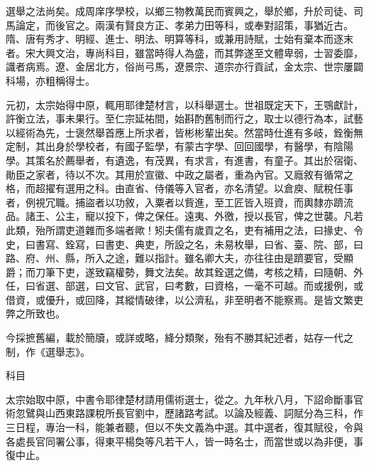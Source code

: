 
\begin{pinyinscope}

 選舉之法尚矣。成周庠序學校，以鄉三物教萬民而賓興之，舉於鄉，升於司徒、司馬論定，而後官之。兩漢有賢良方正、孝弟力田等科，或奉對詔策，事猶近古。隋、唐有秀才、明經、進士、明法、明算等科，或兼用詩賦，士始有棄本而逐末者。宋大興文治，專尚科目，雖當時得人為盛，而其弊遂至文體卑弱，士習委靡，識者病焉。遼、金居北方，俗尚弓馬，遼景宗、道宗亦行貢試，金太宗、世宗屢闢科場，亦粗稱得士。



 元初，太宗始得中原，輒用耶律楚材言，以科舉選士。世祖既定天下，王鶚獻計，許衡立法，事未果行。至仁宗延祐間，始斟酌舊制而行之，取士以德行為本，試藝以經術為先，士褒然舉首應上所求者，皆彬彬輩出矣。然當時仕進有多岐，銓衡無定制，其出身於學校者，有國子監學，有蒙古字學、回回國學，有醫學，有陰陽學。其策名於薦舉者，有遺逸，有茂異，有求言，有進書，有童子。其出於宿衛、勛臣之家者，待以不次。其用於宣徽、中政之屬者，重為內官。又廕敘有循常之格，而超擢有選用之科。由直省、侍儀等入官者，亦名清望。以倉庾、賦稅任事者，例視冗職。捕盜者以功敘，入粟者以貲進，至工匠皆入班資，而輿隸亦躋流品。諸王、公主，寵以投下，俾之保任。遠夷、外徼，授以長官，俾之世襲。凡若此類，殆所謂吏道雜而多端者歟！矧夫儒有歲貢之名，吏有補用之法，曰掾史、令史，曰書寫、銓寫，曰書吏、典吏，所設之名，未易枚舉，曰省、臺、院、部，曰路、府、州、縣，所入之途，難以指計。雖名卿大夫，亦往往由是躋要官，受顯爵；而刀筆下吏，遂致竊權勢，舞文法矣。故其銓選之備，考核之精，曰隨朝、外任，曰省選、部選，曰文官、武官，曰考數，曰資格，一毫不可越。而或援例，或借資，或優升，或回降，其縱情破律，以公濟私，非至明者不能察焉。是皆文繁吏弊之所致也。



 今採摭舊編，載於簡牘，或詳或略，絳分類聚，殆有不勝其紀述者，姑存一代之制，作《選舉志》。



 科目



 太宗始取中原，中書令耶律楚材請用儒術選士，從之。九年秋八月，下詔命斷事官術忽鷿與山西東路課稅所長官劉中，歷諸路考試。以論及經義、詞賦分為三科，作三日程，專治一科，能兼者聽，但以不失文義為中選。其中選者，復其賦役，令與各處長官同署公事，得東平楊奐等凡若干人，皆一時名士，而當世或以為非便，事復中止。




\end{pinyinscope}
